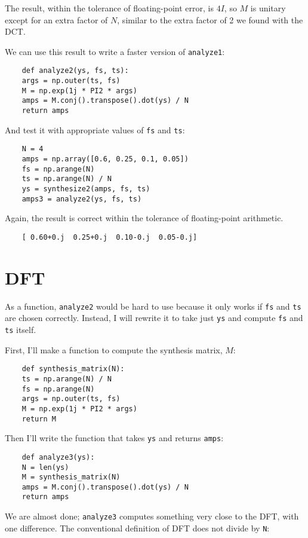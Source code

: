 The result, within the tolerance of floating-point error, is
$4 I$, so $M$ is unitary except for an extra factor of $N$,
similar to the extra factor of 2 we found with the DCT.

We can use this result to write a faster version of {\tt analyze1}:

\begin{verbatim}
	def analyze2(ys, fs, ts):
	args = np.outer(ts, fs)
	M = np.exp(1j * PI2 * args)
	amps = M.conj().transpose().dot(ys) / N
	return amps
\end{verbatim}

And test it with appropriate values of {\tt fs} and {\tt ts}:

\begin{verbatim}
	N = 4
	amps = np.array([0.6, 0.25, 0.1, 0.05])
	fs = np.arange(N)
	ts = np.arange(N) / N
	ys = synthesize2(amps, fs, ts)
	amps3 = analyze2(ys, fs, ts)
\end{verbatim}

Again, the result is correct within the tolerance of floating-point
arithmetic.

\begin{verbatim}
	[ 0.60+0.j  0.25+0.j  0.10-0.j  0.05-0.j]
\end{verbatim}


\section{DFT}
\label{dftsection}

As a function, {\tt analyze2} would be hard to use because it
only works if {\tt fs} and {\tt ts} are chosen correctly.
Instead, I will rewrite it to take just {\tt ys} and compute {\tt fs}
and {\tt ts} itself.

First, I'll make a function to compute the synthesis matrix, $M$:

\begin{verbatim}
	def synthesis_matrix(N):
	ts = np.arange(N) / N
	fs = np.arange(N)
	args = np.outer(ts, fs)
	M = np.exp(1j * PI2 * args)
	return M
\end{verbatim}

Then I'll write the function that takes {\tt ys} and returns
{\tt amps}:

\begin{verbatim}
	def analyze3(ys):
	N = len(ys)
	M = synthesis_matrix(N)
	amps = M.conj().transpose().dot(ys) / N
	return amps
\end{verbatim}

We are almost done; {\tt analyze3} computes something very
close to the DFT, with one difference.  The conventional definition
of DFT does not divide by {\tt N}:


